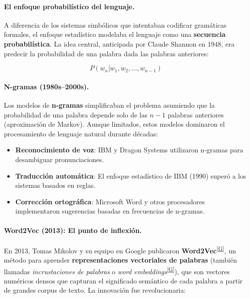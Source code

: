 \documentclass[12pt,a4paper]{report}
\numberwithin{figure}{section}
\begin{document}
\paragraph{El enfoque probabilístico del lenguaje.}
A diferencia de los sistemas simbólicos que intentaban codificar gramáticas formales, el enfoque estadístico modelaba el lenguaje como una \textbf{secuencia probabilística}. La idea central, anticipada por Claude Shannon en 1948, era predecir la probabilidad de una palabra dada las palabras anteriores:

\begin{equation}
P(w_n | w_1, w_2, \ldots, w_{n-1})
\end{equation}

\paragraph{N-gramas (1980s--2000s).}
Los modelos de \textbf{n-gramas} simplificaban el problema asumiendo que la probabilidad de una palabra depende solo de las $n-1$ palabras anteriores (aproximación de Markov). Aunque limitados, estos modelos dominaron el procesamiento de lenguaje natural durante décadas:
\begin{itemize}
    \item \textbf{Reconocimiento de voz}: IBM y Dragon Systems utilizaron n-gramas para desambiguar pronunciaciones.
    \item \textbf{Traducción automática}: El enfoque estadístico de IBM (1990) superó a los sistemas basados en reglas.
    \item \textbf{Corrección ortográfica}: Microsoft Word y otros procesadores implementaron sugerencias basadas en frecuencias de n-gramas.
\end{itemize}

\paragraph{Word2Vec (2013): El punto de inflexión.}
En 2013, Tomas Mikolov y su equipo en Google publicaron \textbf{Word2Vec}\textsuperscript{\hyperref[glos:word2vec]{[G]}}, un método para aprender \textbf{representaciones vectoriales de palabras} (también llamadas \textit{incrustaciones de palabras} o \textit{word embeddings}\textsuperscript{\hyperref[glos:embeddings]{[G]}}), que son vectores numéricos densos que capturan el significado semántico de cada palabra a partir de grandes corpus de texto. La innovación fue revolucionaria:
\end{document}
